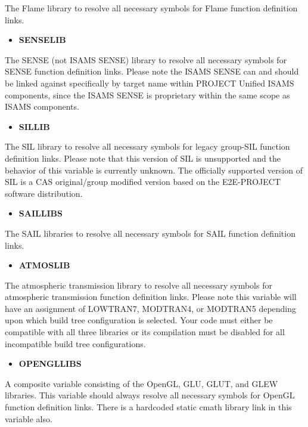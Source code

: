 \documentclass[12pt,letterpaper]{article}
\begin{document}
The Flame library to resolve all necessary symbols for Flame function definition links.

\begin{itemize}
\item \textbf{SENSELIB}
\end{itemize}

The SENSE (not ISAMS SENSE) library to resolve all necessary symbols for SENSE function definition links.  Please note the ISAMS SENSE can and should be linked against specifically by target name within PROJECT Unified ISAMS components, since the ISAMS SENSE is proprietary within the same scope as ISAMS components.

\begin{itemize}
\item \textbf{SILLIB}
\end{itemize}

The SIL library to resolve all necessary symbols for legacy group-SIL function definition links.  Please note that this version of SIL is unsupported and the behavior of this variable is currently unknown.  The officially supported version of SIL is a CAS original/group modified version based on the E2E-PROJECT software distribution.

\begin{itemize}
\item \textbf{SAILLIBS}
\end{itemize}

The SAIL libraries to resolve all necessary symbols for SAIL function definition links.

\begin{itemize}
\item \textbf{ATMOSLIB}
\end{itemize}

The atmospheric transmission library to resolve all necessary symbols for atmospheric transmission function definition links.  Please note this variable will have an assignment of LOWTRAN7, MODTRAN4, or MODTRAN5 depending upon which build tree configuration is selected.  Your code must either be compatible with all three libraries or its compilation must be disabled for all incompatible build tree configurations.

\begin{itemize}
\item \textbf{OPENGLLIBS}
\end{itemize}

A composite variable consisting of the OpenGL, GLU, GLUT, and GLEW libraries.  This variable should always resolve all necessary symbols for OpenGL function definition links.  There is a hardcoded static cmath library link in this variable also.
\end{document}
